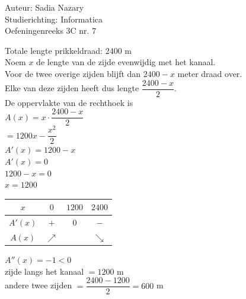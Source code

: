 \documentclass[a4paper]{article}
\begin{document}
  
\noindent \large Auteur: Sadia Nazary  \\
\noindent \large Studierichting: Informatica\\
\noindent \large Oefeningenreeks 3C nr. 7\\

\medskip

\normalsize

Totale lengte prikkeldraad: $2400$ m \\

Noem $x$ de lengte van de zijde evenwijdig met het kanaal. \\

Voor de twee overige zijden blijft dan $2400-x$ meter draad over. \\

Elke van deze zijden heeft dus lengte $\dfrac{2400-x}{2}$. \\

De oppervlakte van de rechthoek is \\

$A(x)=x\cdot\dfrac{2400-x}{2}$ \\

$=1200x-\dfrac{x^2}{2}$ \\

$A'(x)=1200-x$ \\

$A'(x)=0$ \\

$1200-x=0$ \\

$x=1200$ \\

\medskip

\begin{center}
\begin{tabular}{c|ccc}
$x$ & $0$ & $1200$ & $2400$ \\
\hline
$A'(x)$ & $+$ & $0$ & $-$ \\
$A(x)$ & $\nearrow$ & & $\searrow$
\end{tabular}
\end{center}

$A''(x)=-1<0$ \\

zijde langs het kanaal $=1200$ m \\

andere twee zijden $=\dfrac{2400-1200}{2}=600$ m \\

\end{document}
